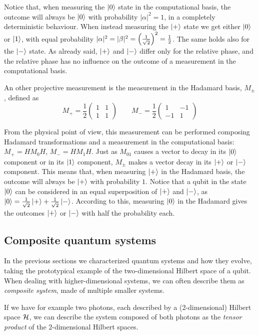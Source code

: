 Notice that, when measuring the $\ket{0}$ state in the computational basis, the outcome will always be $\ket{0}$ with probability $|\alpha|^2 = 1$, in a completely deterministic behaviour. 
When instead measuring the $\ket{+}$ state we get either $\ket{0}$ or $\ket{1}$, with equal probability $|\alpha|^2 = |\beta|^2 = \left(\frac{1}{\sqrt{2}}\right)^2 = \frac{1}{2}$. The same holds also for the $\ket{-}$ state. As already said, $\ket{+}$ and $\ket{-}$ differ only for the relative phase, and the relative phase has no influence on the outcome of a measurement in the computational basis.


An other projective measurement is the measurement in the Hadamard basis, $M_\pm$, defined as \[ M_+ = \frac{1}{2}\begin{pmatrix} 1 & 1 \\ 1 & 1\end{pmatrix} \qquad
M_- = \frac{1}{2}\begin{pmatrix}1 & -1 \\ -1 & 1\end{pmatrix} \]

From the physical point of view, this measurement can be performed composing Hadamard transformations and a measurement in the computational basis: $M_+ = HM_0H$, $M_- = H M_1 H$. Just as $M_{01}$ causes a vector to decay in its $\ket{0}$ component or in its $\ket{1}$ component, $M_\pm$ makes a vector decay in its $\ket{+}$ or $\ket{-}$ component. This means that, when measuring $\ket{+}$ in the Hadamard basis, the outcome will always be $\ket{+}$ with probability $1$. Notice that a qubit in the state $\ket{0}$ can be considered in an equal superposition of $\ket{+}$ and $\ket{-}$, as $\ket{0} = \frac{1}{\sqrt{2}}\ket{+} + \frac{1}{\sqrt{2}}\ket{-}$. According to this, measuring $\ket{0}$ in the Hadamard gives the outcomes $\ket{+}$ or $\ket{-}$ with half the probability each.


\subsection{Composite quantum systems}
In the previous sections we characterized quantum systems and how they evolve, taking the prototypical example of the two-dimensional Hilbert space of a qubit. When dealing with higher-dimensional systems, we can often describe them as \textit{composite system}, made of multiple smaller systems.

If we have for example two photons,  each described by a (2-dimensional) Hilbert space $\mathcal{H}$, we can describe the system composed of both photons as the \textit{tensor product} of the 2-dimensional Hilbert spaces.	

